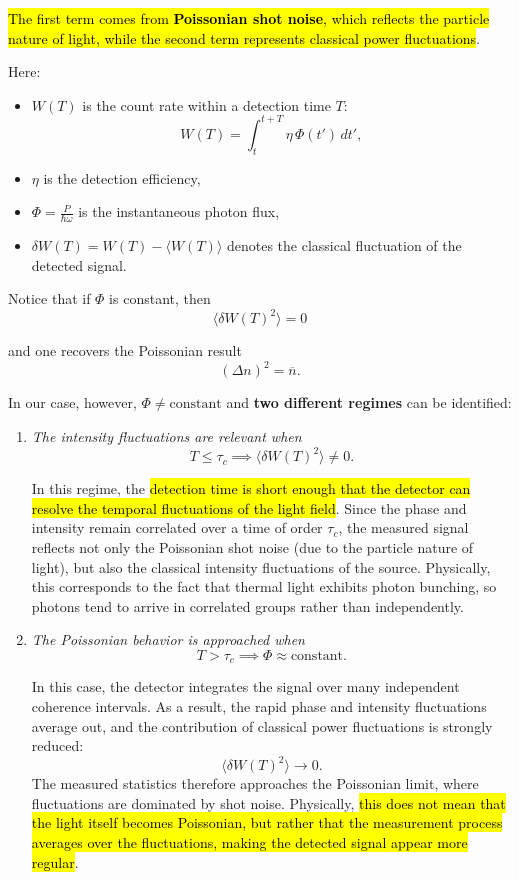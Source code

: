 \hl{The first term comes from \textbf{Poissonian shot noise}, which reflects the particle nature of light, while the second term represents classical power fluctuations}.

Here:
\begin{itemize}
    \item $W(T)$ is the count rate within a detection time $T$:
    \[
    W(T) = \int_t^{t+T} \eta \, \Phi(t')\,dt',
    \]
    \item $\eta$ is the detection efficiency,
    \item $\Phi = \frac{P}{\hbar\omega}$ is the instantaneous photon flux,
    \item $\delta W(T) = W(T)-\langle W(T)\rangle$ denotes the classical fluctuation of the detected signal.
\end{itemize}

Notice that if $\Phi$ is constant, then
\[
\langle \delta W(T)^2\rangle = 0
\]

and one recovers the Poissonian result
\[
(\Delta n)^2 = \overline{n}.
\]

In our case, however, $\Phi \neq \text{constant}$ and \textbf{two different regimes} can be identified:

\begin{enumerate}
    \item \emph{The intensity fluctuations are relevant when}
    \begin{equation}\label{eqn:7-fluctuations-relevant}
    T \leq \tau_c \implies \langle \delta W(T)^2\rangle \neq 0.
    \end{equation}

    In this regime, the \hl{detection time is short enough that the detector can resolve the temporal fluctuations of the light field}. Since the phase and intensity remain correlated over a time of order $\tau_c$, the measured signal reflects not only the Poissonian shot noise (due to the particle nature of light), but also the classical intensity fluctuations of the source. Physically, this corresponds to the fact that thermal light exhibits photon bunching, so photons tend to arrive in correlated groups rather than independently.
    \item \emph{The Poissonian behavior is approached when}
    \begin{equation}\label{eqn:7-poissonian-limit}
    T > \tau_c \implies \Phi \approx \text{constant}.
    \end{equation}

    In this case, the detector integrates the signal over many independent coherence intervals. As a result, the rapid phase and intensity fluctuations average out, and the contribution of classical power fluctuations is strongly reduced:
    \[
    \langle \delta W(T)^2\rangle \to 0.
    \]
    The measured statistics therefore approaches the Poissonian limit, where fluctuations are dominated by shot noise. Physically, \hl{this does not mean that the light itself becomes Poissonian, but rather that the measurement process averages over the fluctuations, making the detected signal appear more regular}.
\end{enumerate}
